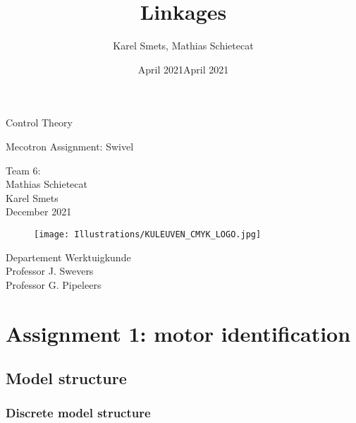 \documentclass[a4paper]{article}
\title{\vspace{5cm} \Huge Linkages}
\author{Karel Smets, Mathias Schietecat}
\date{April 2021}
\def\mydate{December 2021}
\begin{document}
\begin{titlepage}
\date{April 2021}
    \begin{center}
        \vspace*{1cm}
        
        \Huge
        Control Theory 
        
        \vspace{0.5cm}
        \Huge
        Mecotron Assignment: Swivel
        
        \vspace{1.5cm}
        \large
        Team 6:\\
        Mathias Schietecat\\
        Karel Smets\\
        \vspace{1cm}
        \mydate 
        
        \vfill
        
        \begin{figure}[h]
        \centering
        \texttt{[image: Illustrations/KULEUVEN\_CMYK\_LOGO.jpg]}
        \end{figure}
        
        \vspace{1cm}
        \large
        Departement Werktuigkunde\\
        Professor J. Swevers\\
        Professor G. Pipeleers\\
    \end{center}
\end{titlepage}

\newpage

\setcounter{page}{2}
\tableofcontents

\newpage

\section{Assignment 1: motor identification}

\subsection{Model structure}
\subsubsection{Discrete model structure}
\end{document}
